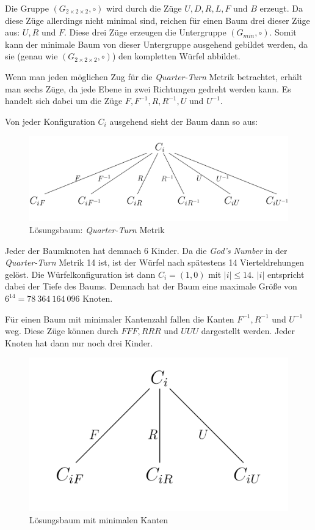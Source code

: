 \documentclass[12pt,a4paper, usenames, dvipsnames]{article}
\theoremstyle{mystyle}
\theoremstyle{definition}
\newcommand{\Gtwo}{\ensuremath{G_{2\times 2\times 2}}}
\begin{document}
Die Gruppe $(\Gtwo, \circ)$ wird durch die Züge $U, D, R, L, F$ und $B$ erzeugt. Da diese Züge allerdings nicht minimal sind, reichen für einen Baum drei dieser Züge aus: $U, R$ und $F$. Diese drei Züge erzeugen die Untergruppe $(G_{min}, \circ)$. Somit kann der minimale Baum von dieser Untergruppe ausgehend gebildet werden, da sie (genau wie $(\Gtwo, \circ)$) den kompletten Würfel abbildet.

Wenn man jeden möglichen Zug für die \textit{Quarter-Turn} Metrik betrachtet, erhält man sechs Züge, da jede Ebene in zwei Richtungen gedreht werden kann. Es handelt sich dabei um die Züge $F, F^{-1}, R, R^{-1}, U$ und $U^{-1}$.

Von jeder Konfiguration $C_i$ ausgehend sieht der Baum dann so aus:

\begin{figure}[H]
\centering
\includegraphics[scale=1.5]{Baum_1.jpg}
\caption{Lösungsbaum: \textit{Quarter-Turn} Metrik}
\label{Abbildung_BaumQTM}
\end{figure}

Jeder der Baumknoten hat demnach 6 Kinder. Da die \textit{God's Number} in der \textit{Quarter-Turn} Metrik 14 ist, ist der Würfel nach spätestens 14 Vierteldrehungen gelöst. Die Würfelkonfiguration ist dann $C_i = (1, 0)$ mit $|i| \leq 14$. $|i|$ entspricht dabei der Tiefe des Baums. Demnach hat der Baum eine maximale Größe von $6^{14} = 78 \ 364 \ 164 \ 096$ Knoten.

Für einen Baum mit minimaler Kantenzahl fallen die Kanten $F^{-1}, R^{-1}$ und $U^{-1}$ weg. Diese Züge können durch $FFF, RRR$ und $UUU$ dargestellt werden. Jeder Knoten hat dann nur noch drei Kinder. 

\begin{figure}[H]
\centering
\includegraphics[scale=0.45]{Baum_2.jpg}
\caption{Lösungsbaum mit minimalen Kanten}
\label{Abbildung_BaumMin}
\end{figure}
\end{document}
